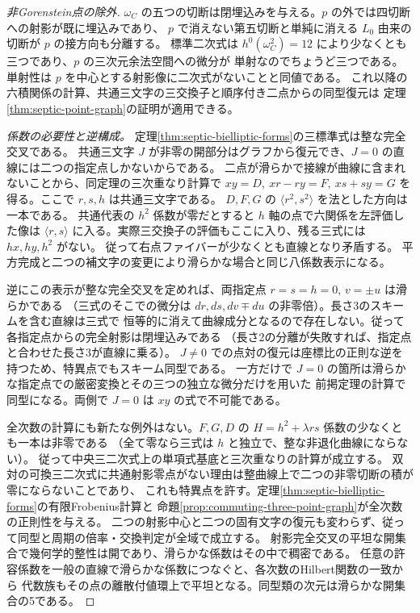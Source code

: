 \begin{proof}[非Gorenstein点の除外]
$\omega_C$ の五つの切断は閉埋込みを与える。$p$ の外では四切断への射影が既に埋込みであり、
$p$ で消えない第五切断と単純に消える $L_0$ 由来の切断が $p$ の接方向も分離する。
標準二次式は $h^0(\omega_C^2)=12$ により少なくとも三つであり、$p$ の三次元余法空間への微分が
単射なのでちょうど三つである。単射性は $p$ を中心とする射影像に二次式がないことと同値である。
これ以降の六積関係の計算、共通三文字の三交換子と順序付き二点からの同型復元は
定理\ref{thm:septic-point-graph}の証明が適用できる。

\smallskip
\noindent\textit{係数の必要性と逆構成。}
定理\ref{thm:septic-bielliptic-forms}の三標準式は整な完全交叉である。
共通三文字 $J$ が非零の開部分はグラフから復元でき、$J=0$ の直線には二つの指定点しかないからである。
二点が滑らかで接線が曲線に含まれないことから、同定理の三次重なり計算で
$xy=D,\ xr-ry=F,\ xs+sy=G$ を得る。ここで $r,s,h$ は共通三文字である。
$D,F,G$ の $\langle r^2,s^2\rangle$ を法とした方向は一本である。
共通代表の $h^2$ 係数が零だとすると $h$ 軸の点で六関係を左評価した像は
$\langle r,s\rangle$ に入る。実際三交換子の評価もここに入り、残る三式には $hx,hy,h^2$ がない。
従って右点ファイバーが少なくとも直線となり矛盾する。
平方完成と二つの補文字の変更により滑らかな場合と同じ八係数表示になる。

逆にこの表示が整な完全交叉を定めれば、両指定点 $r=s=h=0$, $v=\pm u$ は滑らかである
（三式のそこでの微分は $dr,ds,dv\mp du$ の非零倍）。長さ3のスキームを含む直線は三式で
恒等的に消えて曲線成分となるので存在しない。従って各指定点からの完全射影は閉埋込みである
（長さ2の分離が失敗すれば、指定点と合わせた長さ3が直線に乗る）。
$J\ne0$ での点対の復元は座標比の正則な逆を持つため、特異点でもスキーム同型である。
一方だけで $J=0$ の箇所は滑らかな指定点での厳密変換とその三つの独立な微分だけを用いた
前掲定理の計算で同型になる。両側で $J=0$ は $xy$ の式で不可能である。

全次数の計算にも新たな例外はない。$F,G,D$ の $H=h^2+\lambda rs$ 係数の少なくとも一本は非零である
（全て零なら三式は $h$ と独立で、整な非退化曲線にならない）。
従って中央三二次式上の単項式基底と三次重なりの計算が成立する。
双対の可換三二次式に共通射影零点がない理由は整曲線上で二つの非零切断の積が零にならないことであり、
これも特異点を許す。定理\ref{thm:septic-bielliptic-forms}の有限Frobenius計算と
命題\ref{prop:commuting-three-point-graph}が全次数の正則性を与える。
二つの射影中心と二つの固有文字の復元も変わらず、従って同型と周期の倍率・交換判定が全域で成立する。
射影完全交叉の平坦な開集合で幾何学的整性は開であり、滑らかな係数はその中で稠密である。
任意の許容係数を一般の直線で滑らかな係数につなぐと、各次数のHilbert関数の一致から
代数族もその点の離散付値環上で平坦となる。同型類の次元は滑らかな開集合の5である。
\end{proof}

